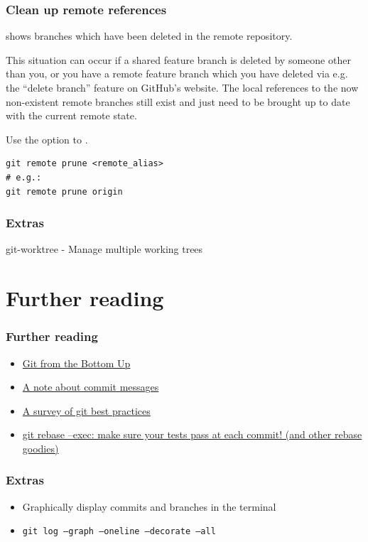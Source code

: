 \documentclass{git_course}
\begin{document}
\begin{frame}[fragile]
    \frametitle{Clean up remote references}

      shows branches which have been
    deleted in the remote repository.

    This situation can occur if a shared feature branch is deleted by
    someone other than you, or you have a remote feature branch which you
    have deleted via e.g. the ``delete branch'' feature on GitHub's website.
    The local references to the now non-existent remote branches still exist
    and just need to be brought up to date with the current remote state.

     Use the  option to .

\begin{lstlisting}
git remote prune <remote_alias>
# e.g.:
git remote prune origin
\end{lstlisting}
\end{frame}

\begin{frame}
\frametitle{Extras}
git-worktree - Manage multiple working trees
\end{frame}

\section{Further reading}

\begin{frame}
\frametitle{Further reading}
\begin{itemize}
    \item \href{http://jwiegley.github.io/git-from-the-bottom-up/}{Git from the Bottom Up}
    \item \href{http://tbaggery.com/2008/04/19/a-note-about-git-commit-messages.html}
               {A note about commit messages}
    \item \href{https://xdg.me/blog/a-survey-of-git-best-practices/}
               {A survey of git best practices}
    \item \href{http://kamalmarhubi.com/blog/2016/03/08/git-rebase-exec-make-sure-your-tests-pass-at-each-commit-and-other-rebase-goodies/}
               {git rebase --exec: make sure your tests pass at each commit!  (and other rebase goodies)}
\end{itemize}
\end{frame}

\begin{frame}
    \frametitle{Extras}
    \begin{itemize}
        \item Graphically display commits and branches in the terminal
        \item \texttt{git log --graph --oneline --decorate --all}
    \end{itemize}
\end{frame}
\end{document}

